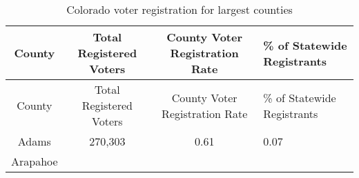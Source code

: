 \documentclass[12pt,twoside]{reedthesis}
\begin{document}
  \begin{longtable}[]{@{}cccl@{}}
  \caption{Colorado voter registration for largest counties
  \label{tab:voter_reg}}\tabularnewline
  \toprule
  \begin{minipage}[b]{0.10\columnwidth}\centering\strut
  County\strut
  \end{minipage} & \begin{minipage}[b]{0.24\columnwidth}\centering\strut
  Total Registered Voters\strut
  \end{minipage} & \begin{minipage}[b]{0.29\columnwidth}\centering\strut
  County Voter Registration Rate\strut
  \end{minipage} & \begin{minipage}[b]{0.25\columnwidth}\raggedright\strut
  \% of Statewide Registrants\strut
  \end{minipage}\tabularnewline
  \midrule
  \endfirsthead
  \toprule
  \begin{minipage}[b]{0.10\columnwidth}\centering\strut
  County\strut
  \end{minipage} & \begin{minipage}[b]{0.24\columnwidth}\centering\strut
  Total Registered Voters\strut
  \end{minipage} & \begin{minipage}[b]{0.29\columnwidth}\centering\strut
  County Voter Registration Rate\strut
  \end{minipage} & \begin{minipage}[b]{0.25\columnwidth}\raggedright\strut
  \% of Statewide Registrants\strut
  \end{minipage}\tabularnewline
  \midrule
  \endhead
  \begin{minipage}[t]{0.10\columnwidth}\centering\strut
  Adams\strut
  \end{minipage} & \begin{minipage}[t]{0.24\columnwidth}\centering\strut
  270,303\strut
  \end{minipage} & \begin{minipage}[t]{0.29\columnwidth}\centering\strut
  0.61\strut
  \end{minipage} & \begin{minipage}[t]{0.25\columnwidth}\raggedright\strut
  0.07\strut
  \end{minipage}\tabularnewline
  \begin{minipage}[t]{0.10\columnwidth}\centering\strut
  Arapahoe\strut
  \end{minipage} & \begin{minipage}[t]{0.24\columnwidth}\centering\strut

\end{minipage}
\end{longtable}
\end{document}
